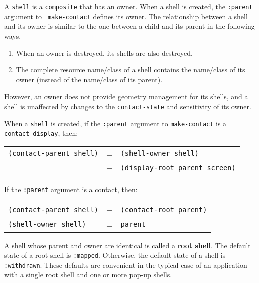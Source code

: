 \documentclass[twoside]{book}
\begin{document}
\begin{sloppy}
{\begin{flushright}
{\begin{tabular}{lll}
\end{tabular}
\rm

}\end{flushright}}




A {\tt shell} is a {\tt composite} that has an owner.
When a shell is created, the {\tt :parent} argument to {\tt
make-contact} defines its owner. The relationship
between a shell and its
owner is similar to the one between a child and its parent in the
following ways.

\begin{enumerate}
\item When an owner is destroyed, its shells are also destroyed.
\item The complete resource name/class of a shell contains the name/class
	   of its owner (instead of the name/class of its parent).
\end{enumerate}

However, an owner does not provide geometry management for its shells, and a
shell is unaffected by changes to the {\tt contact-state} and sensitivity
of its owner.

When a {\tt shell} is created, if the {\tt :parent} argument to
{\tt make-contact} is a {\tt contact-display}, then:

\begin{center}
\begin{tabular}{lll}
{\tt (contact-parent shell)} & =  & {\tt (shell-owner shell)}\\
                             & =  &{\tt (display-root parent screen)}\\
\end{tabular} \end{center}

If the {\tt :parent} argument is a contact, then:

\begin{center}
\begin{tabular}{lll}
{\tt (contact-parent shell)} & =  & {\tt (contact-root parent)}\\
{\tt (shell-owner shell)}    & =  & {\tt parent}\\ 
\end{tabular} \end{center}

A shell whose parent and owner are identical is called a {\bf root
shell}. The default state of a root
shell is {\tt :mapped}. Otherwise, the default state of a shell is {\tt
:withdrawn}. These defaults are convenient in the typical case of an
application with a single root shell and one or more pop-up
shells.



\end{sloppy}
\end{document}
